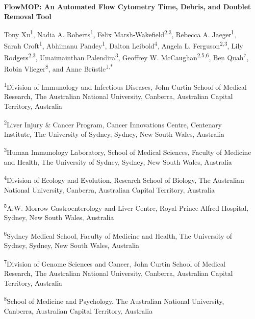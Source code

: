 \documentclass[ASNA]{latex/wiley/USG}
\begin{document}
\pagestyle{plain}
\setlength{\parindent}{0pt}
\setlength{\parskip}{\baselineskip}
\raggedbottom

\newcommand{\aff}[1]{\textsuperscript{#1}}
\begin{center}
{\LARGE\bfseries FlowMOP: An Automated Flow Cytometry Time, Debris, and
Doublet Removal Tool\par}
\vspace{1em}
{\normalsize
Tony Xu\aff{1},
Nadia A. Roberts\aff{1},
Felix Marsh-Wakefield\aff{2,3},
Rebecca A. Jaeger\aff{1},
Sarah Croft\aff{1},
Abhimanu Pandey\aff{1},
Dalton Leibold\aff{4},
Angela L. Ferguson\aff{2,3},
Lily Rodgers\aff{2,3},
Umaimainthan Palendira\aff{3},
Geoffrey W. McCaughan\aff{2,5,6},
Ben Quah\aff{7},
Robin Vlieger\aff{8}, and
Anne Brüstle\aff{1,*}\par}
\vspace{0.8em}
{\small
\textsuperscript{1}Division of Immunology and Infectious Diseases, John Curtin School of Medical Research, The Australian National University, Canberra, Australian Capital Territory, Australia\par
\textsuperscript{2}Liver Injury \& Cancer Program, Cancer Innovations Centre, Centenary Institute, The University of Sydney, Sydney, New South Wales, Australia\par
\textsuperscript{3}Human Immunology Laboratory, School of Medical Sciences, Faculty of Medicine and Health, The University of Sydney, Sydney, New South Wales, Australia\par
\textsuperscript{4}Division of Ecology and Evolution, Research School of Biology, The Australian National University, Canberra, Australian Capital Territory, Australia\par
\textsuperscript{5}A.W. Morrow Gastroenterology and Liver Centre, Royal Prince Alfred Hospital, Sydney, New South Wales, Australia\par
\textsuperscript{6}Sydney Medical School, Faculty of Medicine and Health, The University of Sydney, Sydney, New South Wales, Australia\par
\textsuperscript{7}Division of Genome Sciences and Cancer, John Curtin School of Medical Research, The Australian National University, Canberra, Australian Capital Territory, Australia\par
\textsuperscript{8}School of Medicine and Psychology, The Australian National University, Canberra, Australian Capital Territory, Australia\par}
\end{center}
\end{document}
